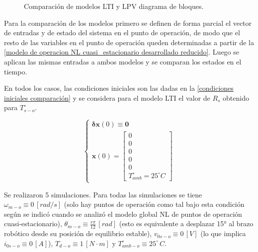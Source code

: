\documentclass[a4paper, 10pt, onecolumn,journal]{ieeeconf}
\begin{document}
\begin{figure}[H]
	\centering
	\begin{adjustbox}{max width=\columnwidth}
	\end{adjustbox}
	\caption{Comparación de modelos LTI y LPV diagrama de bloques.}
	\label{diagrama de bloques LPV vs LTI}
\end{figure}

Para la comparación de los modelos primero se definen de forma parcial el vector de entradas y de estado del sistema en el punto de operación,
de modo que el resto de las variables en el punto de operación queden determinadas a partir de la \cref{modelo de operacion NL cuasi_estacionario desarrollado reducido}. Luego se aplican
las mismas entradas a ambos modelos y se comparan los estados en el tiempo.

En todos los casos, las condiciones iniciales son las dadas en la \cref{condiciones iniciales comparación} y se considera para 
el modelo LTI el valor de $R_s$ obtenido para $T^\circ_{s-o}$.

\begin{equation}
	\begin{cases}
		\mathbf{\delta x}(0) \equiv \mathbf{0}\\
		\mathbf{x}(0) 
		=
		\begin{bmatrix} 
			0 \\ 
			0 \\ 
			0 \\ 
			0 \\ 
			0 \\ 
			T^\circ_{amb} = 25^\circ C
		\end{bmatrix}
	\end{cases}
	\label{condiciones iniciales comparación}
\end{equation}

Se realizaron 5 simulaciones. Para todas las simulaciones se tiene 
$\omega_{m-o} \equiv 0\,\left[rad/s\right]$ (solo hay puntos de operación como tal bajo esta condición según
se indicó cuando se analizó el modelo global NL de puntos de operación cuasi-estacionario), $\theta_{m-o}\equiv \frac{r\pi}{12}\,\left[rad\right]$ (esto
es equivalente a desplazar 15° al brazo robótico desde su posición de equilibrio estable), $v_{0s-o} \equiv 0\,\left[V\right]$ (lo que implica $i_{0s-o}\equiv 0\, \left[A\right]$), $T_{d-o} \equiv 1\, \left[N\cdot m\right]$
y $T^\circ_{amb-o}\equiv 25^\circ\, C$.
\end{document}
